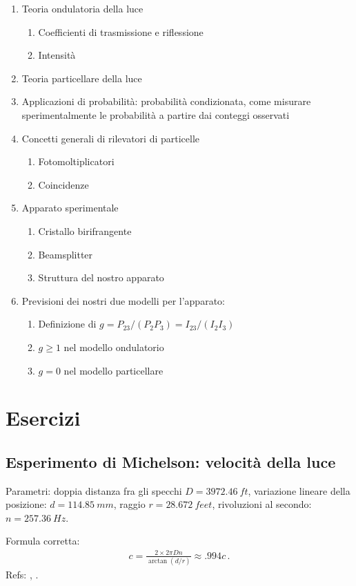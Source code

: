 \documentclass{article}
\begin{document}
\begin{enumerate}
    \item Teoria ondulatoria della luce
    \begin{enumerate}
        \item Coefficienti di trasmissione e riflessione
        \item Intensità
    \end{enumerate}
    \item Teoria particellare della luce
    \item Applicazioni di probabilità: probabilità condizionata, come misurare sperimentalmente le probabilità a partire dai conteggi osservati
    \item Concetti generali di rilevatori di particelle
    \begin{enumerate}
        \item Fotomoltiplicatori
        \item Coincidenze
    \end{enumerate}
    \item Apparato sperimentale
    \begin{enumerate}
        \item Cristallo birifrangente
        \item Beamsplitter
        \item Struttura del nostro apparato
    \end{enumerate}
    \item Previsioni dei nostri due modelli per l'apparato:
    \begin{enumerate}
        \item Definizione di \(g = P_{23}/(P_2 P_3) = I_{23}/(I_2 I_3)\)
        \item \(g \geq 1\) nel modello ondulatorio
        \item \(g = 0\) nel modello particellare
    \end{enumerate}
\end{enumerate}

\section{Esercizi}

\subsection{Esperimento di Michelson: velocità della luce}

Parametri: doppia distanza fra gli specchi \(D = \SI{3972.46}{ft}\), variazione lineare della posizione: \(d = \SI{114.85}{mm}\), raggio \(r = \SI{28.672}{feet}\), rivoluzioni al secondo: \(n = \SI{257.36}{Hz}\).

Formula corretta: 
%
\begin{align}
c = \frac{2 \times 2 \pi Dn}{\arctan(d / r)} \approx \num{.994} c
\,.
\end{align}
%
Refs: \cite[]{michelsonExperimentalDeterminationVelocity1880}, \cite[]{FizeauFoucaultApparatus2019}.

\printbibliography
\end{document}
